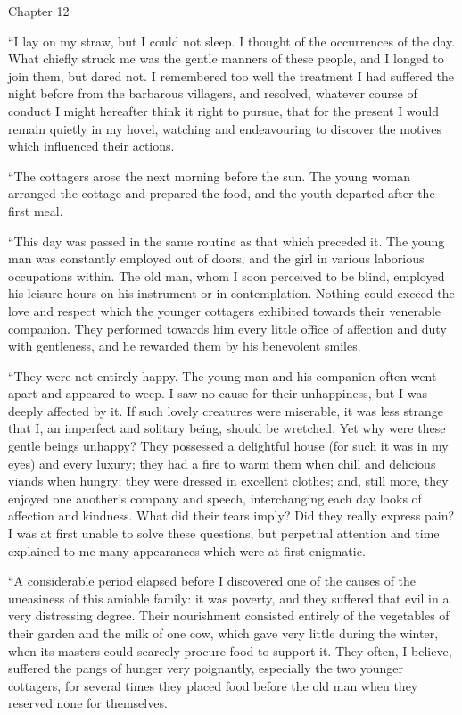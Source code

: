 \documentclass[12pt,openright]{book}
\begin{document}
Chapter 12

“I lay on my straw, but I could not sleep. I thought of the occurrences of the day. What chiefly struck me was the gentle manners of these people, and I longed to join them, but dared not. I remembered too well the treatment I had suffered the night before from the barbarous villagers, and resolved, whatever course of conduct I might hereafter think it right to pursue, that for the present I would remain quietly in my hovel, watching and endeavouring to discover the motives which influenced their actions.

“The cottagers arose the next morning before the sun. The young woman arranged the cottage and prepared the food, and the youth departed after the first meal.

“This day was passed in the same routine as that which preceded it. The young man was constantly employed out of doors, and the girl in various laborious occupations within. The old man, whom I soon perceived to be blind, employed his leisure hours on his instrument or in contemplation. Nothing could exceed the love and respect which the younger cottagers exhibited towards their venerable companion. They performed towards him every little office of affection and duty with gentleness, and he rewarded them by his benevolent smiles.

“They were not entirely happy. The young man and his companion often went apart and appeared to weep. I saw no cause for their unhappiness, but I was deeply affected by it. If such lovely creatures were miserable, it was less strange that I, an imperfect and solitary being, should be wretched. Yet why were these gentle beings unhappy? They possessed a delightful house (for such it was in my eyes) and every luxury; they had a fire to warm them when chill and delicious viands when hungry; they were dressed in excellent clothes; and, still more, they enjoyed one another’s company and speech, interchanging each day looks of affection and kindness. What did their tears imply? Did they really express pain? I was at first unable to solve these questions, but perpetual attention and time explained to me many appearances which were at first enigmatic.

“A considerable period elapsed before I discovered one of the causes of the uneasiness of this amiable family: it was poverty, and they suffered that evil in a very distressing degree. Their nourishment consisted entirely of the vegetables of their garden and the milk of one cow, which gave very little during the winter, when its masters could scarcely procure food to support it. They often, I believe, suffered the pangs of hunger very poignantly, especially the two younger cottagers, for several times they placed food before the old man when they reserved none for themselves.
\end{document}
